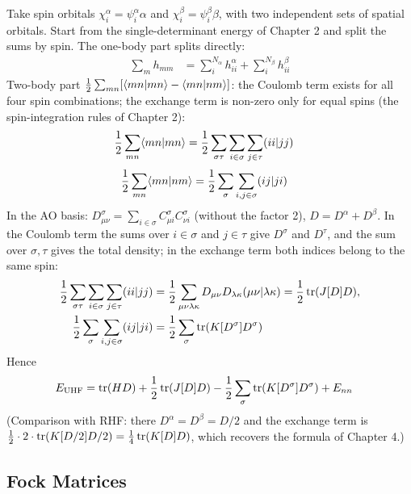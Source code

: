 Take spin orbitals $\chi_i^\alpha = \psi_i^\alpha \alpha$ and $\chi_i^\beta = \psi_i^\beta \beta$, with two independent sets of spatial orbitals. Start from the single-determinant energy of Chapter 2 and split the sums by spin. The one-body part splits directly:
\begin{align*}
\sum_m h_{mm} &= \sum_i^{N_\alpha} h_{ii}^\alpha + \sum_i^{N_\beta} h_{ii}^\beta
\end{align*}
Two-body part $\frac{1}{2} \sum_{mn} [\langle mn\vert mn\rangle - \langle mn\vert nm\rangle]$: the Coulomb term exists for all four spin combinations; the exchange term is non-zero only for equal spins (the spin-integration rules of Chapter 2):
\begin{align*}
\frac{1}{2} \sum_{mn} \langle mn\vert mn\rangle &= \frac{1}{2} \sum_{\sigma \tau} \sum_{i \in \sigma} \sum_{j \in \tau} (ii\vert jj)
\end{align*}
\begin{align*}
\frac{1}{2} \sum_{mn} \langle mn\vert nm\rangle &= \frac{1}{2} \sum_{\sigma} \sum_{i,j \in \sigma} (ij\vert ji)
\end{align*}
In the AO basis: $D^\sigma_{\mu \nu} = \sum_{i \in \sigma} C^\sigma_{\mu i} C^\sigma_{\nu i}$ (without the factor 2), $D = D^\alpha + D^\beta$. In the Coulomb term the sums over $i \in \sigma$ and $j \in \tau$ give $D^{\sigma}$ and $D^\tau$, and the sum over $\sigma, \tau$ gives the total density; in the exchange term both indices belong to the same spin:
\begin{align*}
\frac{1}{2} \sum_{\sigma \tau} \sum_{i \in \sigma} \sum_{j \in \tau} (ii\vert jj) &= \frac{1}{2} \sum_{\mu \nu \lambda \kappa} D_{\mu \nu} D_{\lambda \kappa} (\mu \nu\vert \lambda \kappa) = \frac{1}{2} \operatorname{tr}(J[D] D), \\
\frac{1}{2} \sum_{\sigma} \sum_{i,j \in \sigma} (ij\vert ji) &= \frac{1}{2} \sum_{\sigma} \operatorname{tr}(K[D^\sigma] D^\sigma)
\end{align*}
Hence
\begin{align}\label{eq:euhf}
E_{\text{UHF}} &= \operatorname{tr}(H D) + \frac{1}{2} \operatorname{tr}(J[D] D) - \frac{1}{2} \sum_{\sigma} \operatorname{tr}(K[D^{\sigma}] D^{\sigma}) + E_{nn}
\end{align}
(Comparison with RHF: there $D^\alpha = D^\beta = D/2$ and the exchange term is $\frac{1}{2} \cdot 2 \cdot \operatorname{tr}(K[D/2] D/2) = \frac{1}{4} \operatorname{tr}(K[D] D)$, which recovers the formula of Chapter 4.)

\subsection{Fock Matrices}

